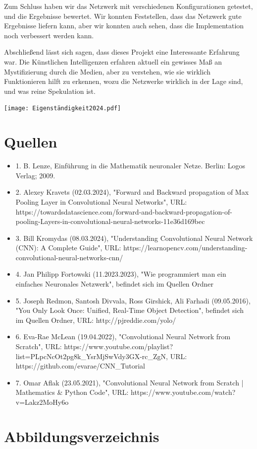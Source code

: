 \documentclass[12pt]{article}
\begin{document}
Zum Schluss haben wir das Netzwerk mit verschiedenen Konfigurationen getestet, und die Ergebnisse bewertet. Wir konnten Feststellen, dass das Netzwerk gute Ergebnisse liefern kann, aber wir konnten auch sehen, dass die Implementation noch verbessert werden kann.

Abschließend lässt sich sagen, dass dieses Projekt eine Interessante Erfahrung war. Die Künstlichen Intelligenzen erfahren aktuell ein gewisses Maß an Mystifizierung durch die Medien, aber zu verstehen, wie sie wirklich Funktionieren hilft zu erkennen, wozu die Netzwerke wirklich in der Lage sind, und was reine Spekulation ist. 

\cleardoublepage
\thispagestyle{empty}
\texttt{[image: Eigenständigkeit2024.pdf]}

\cleardoublepage
\sloppy
\section{Quellen}
\begin{itemize}
\item 1. B. Lenze, Einführung in die Mathematik neuronaler Netze. Berlin: Logos Verlag; 2009.
\item 2. Alexey Kravets (02.03.2024), "Forward and Backward propagation of Max Pooling Layer in Convolutional Neural Networks", URL: https://towardsdatascience.com/forward-and-backward-propagation-of-pooling-Layers-in-convolutional-neural-networks-11e36d169bec
\item 3. Bill Kromydas (08.03.2024), "Understanding Convolutional Neural Network (CNN): A Complete Guide", URL: https://learnopencv.com/understanding-convolutional-neural-networks-cnn/
\item 4. Jan Philipp Fortowski (11.2023.2023), "Wie programmiert man ein einfaches Neuronales Netzwerk", befindet sich im Quellen Ordner
\item 5. Joseph Redmon, Santosh Divvala, Ross Girshick, Ali Farhadi (09.05.2016), "You Only Look Once:
Unified, Real-Time Object Detection", befindet sich im Quellen Ordner, URL: http://pjreddie.com/yolo/
\item 6. Eva-Rae McLean (19.04.2022), "Convolutional Neural Network from Scratch", URL: https://www.youtube.com/playlist?list=PLpcNcOt2pg8k\_YsrMjSwVdy3GX-rc\_ZgN, URL: https://github.com/evarae/CNN\_Tutorial
\item 7. Omar Aflak (23.05.2021), "Convolutional Neural Network from Scratch | Mathematics \& Python Code", URL: https://www.youtube.com/watch?v=Lakz2MoHy6o


\end{itemize}

\cleardoublepage
\section{Abbildungsverzeichnis}
\listoffigures
\end{document}
